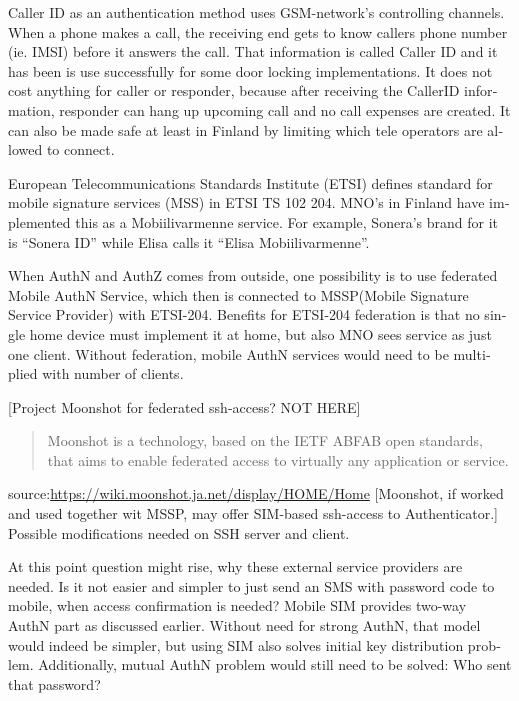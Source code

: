 \documentclass[12pt,a4paper,english]{tutthesis}
\begin{document}
\begin{otherlanguage}{english}
Caller ID as an authentication method uses GSM-network's controlling
channels. When a phone makes a call, the receiving end gets 
to know callers phone number (ie. IMSI) before it answers the call.
That information is called Caller ID and it has been is use
successfully for some door locking implementations. 
It does not cost anything for caller or responder,
because after receiving the CallerID  information, responder can hang
up upcoming call and no call expenses are created.
 It can also be made safe at least in Finland
by limiting which tele operators are allowed to connect.
















European Telecommunications Standards Institute (ETSI) defines
standard for mobile signature services (MSS) in ETSI TS 102 204.
MNO's in Finland have implemented this as a Mobiilivarmenne
service. 
For example, Sonera's brand for  it is ``Sonera ID'' while Elisa calls it
``Elisa Mobiilivarmenne''.

When AuthN and AuthZ comes from outside, one possibility is to use
federated Mobile AuthN Service, which then is connected to MSSP(Mobile
Signature Service Provider) with ETSI-204. Benefits for ETSI-204
federation is that no single home device must implement it at home,
but also MNO sees service as just one client.  Without federation,
mobile AuthN services would need to be multiplied with number of
clients.


[Project Moonshot for federated ssh-access? NOT HERE]
\begin{quote}
Moonshot is a technology, based on the IETF ABFAB open standards, that aims to enable federated access to virtually any application or service.
\end{quote}
source:\url{https://wiki.moonshot.ja.net/display/HOME/Home}
[Moonshot, if worked and used together wit MSSP, may offer SIM-based
ssh-access to Authenticator.] Possible modifications needed on SSH
server and client.

At this point question might rise, why these external service
providers are needed. Is it not easier and simpler to just send 
an SMS with password code to mobile, when access confirmation is needed?
Mobile SIM provides two-way AuthN part as discussed earlier.
Without need for strong AuthN, that model would indeed be 
simpler, but using SIM also solves initial key distribution problem.
Additionally, mutual AuthN problem would still need to be solved:
Who sent that password?




\end{otherlanguage}
\end{document}
